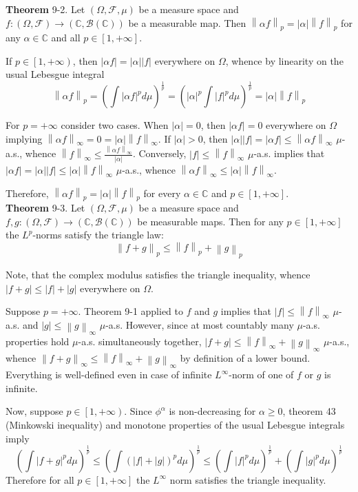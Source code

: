 \documentclass[a4paper]{article}
\newcommand{\clo}[1]{\left [ #1 \right ]}
\newcommand{\clop}[1]{\left [ #1 \right )}
\newcommand{\brac}[1]{\left ( #1 \right )}
\newcommand{\abs}[1]{\left | #1 \right |}
\newcommand{\nrm}[1]{\left\| #1 \right \|}
\newcommand{\Cplx}{\mathbb{C}}
\newcommand{\Fcal}{\mathcal{F}}
\newcommand{\borel}[1]{\mathcal{B}\brac{#1}}
\begin{document}
\label{thm:l_p_norm_scaling} \noindent \textbf{Theorem} 9-2.
Let $\brac{\Omega, \Fcal, \mu}$ be a measure space and $f:\brac{\Omega, \Fcal}\to\brac{\Cplx, \borel{\Cplx}}$ be a measurable map. Then $\nrm{\alpha f}_p = \abs{\alpha} \nrm{f}_p$ for any $\alpha \in \Cplx$ and all $p\in \clo{1,+\infty}$.

If $p\in \clop{1, +\infty}$, then $\abs{\alpha f} = \abs{\alpha} \abs{f}$ everywhere on $\Omega$, whence by linearity on the usual Lebesgue integral \[\nrm{\alpha f}_p = \brac{\int \abs{\alpha f}^p d\mu}^\frac{1}{p} = \brac{\abs{\alpha}^p \int \abs{f}^p d\mu}^\frac{1}{p} = \abs{\alpha} \nrm{f}_p\]

For $p=+\infty$ consider two cases. When $\abs{\alpha}=0$, then $\abs{\alpha f} = 0$ everywhere on $\Omega$ implying $\nrm{\alpha f}_\infty = 0 = \abs{\alpha} \nrm{f}_\infty$. If $\abs{\alpha}>0$, then $\abs{\alpha} \abs{f} = \abs{\alpha f}\leq \nrm{\alpha f}_\infty$ $\mu$-a.s., whence $\nrm{f}_\infty \leq \frac{\nrm{\alpha f}_\infty}{\abs{\alpha}}$. Conversely, $\abs{f}\leq \nrm{f}_\infty$ $\mu$-a.s. implies that $\abs{\alpha f}=\abs{\alpha} \abs{f}\leq \abs{\alpha} \nrm{f}_\infty$ $\mu$-a.s., whence $\nrm{\alpha f}_\infty \leq \abs{\alpha} \nrm{f}_\infty$.

Therefore, $\nrm{\alpha f}_p = \abs{\alpha} \nrm{f}_p$ for every $\alpha\in \Cplx$ and $p\in \clo{1, +\infty}$.\\

\label{thm:l_p_norm_triangle} \noindent \textbf{Theorem} 9-3.
Let $\brac{\Omega, \Fcal, \mu}$ be a measure space and $f,g:\brac{\Omega, \Fcal}\to\brac{\Cplx, \borel{\Cplx}}$ be measurable maps. Then for any $p\in \clo{1,+\infty}$ the $L^p$-norms satisfy the triangle law: \[ \nrm{f+g}_p\leq \nrm{f}_p + \nrm{g}_p \]

Note, that the complex modulus satisfies the triangle inequality, whence $\abs{f+g} \leq \abs{f} + \abs{g}$ everywhere on $\Omega$.

Suppose $p=+\infty$. Theorem 9-1 applied to $f$ and $g$ implies that $\abs{f} \leq \nrm{f}_\infty$ $\mu$-a.s. and $\abs{g}\leq \nrm{g}_\infty$ $\mu$-a.s. However, since at most countably many $\mu$-a.s. properties hold $\mu$-a.s. simultaneously together, $\abs{f+g} \leq \nrm{f}_\infty + \nrm{g}_\infty$ $\mu$-a.s., whence $\nrm{f+g}_\infty \leq \nrm{f}_\infty + \nrm{g}_\infty$ by definition of a lower bound. Everything is well-defined even in case of infinite $L^\infty$-norm of one of $f$ or $g$ is infinite.

Now, suppose $p\in \clop{1, +\infty}$. Since $\phi^\alpha$ is non-decreasing for $\alpha\geq 0$, theorem 43 (Minkowski inequality) and monotone properties of the usual Lebesgue integrals imply \[\brac{ \int \abs{f+g}^p d\mu }^\frac{1}{p} \leq \brac{ \int \brac{\abs{f}+\abs{g}}^p d\mu }^\frac{1}{p} \leq \brac{ \int \abs{f}^p d\mu }^\frac{1}{p} +\brac{ \int \abs{g}^p d\mu }^\frac{1}{p}\] Therefore for all $p\in \clo{1, +\infty}$ the $L^\infty$ norm satisfies the triangle inequality.\\
\end{document}
